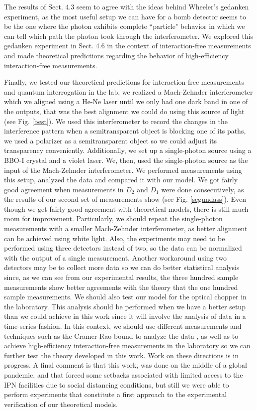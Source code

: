 \documentclass[12pt]{book}
\begin{document}
The results of Sect. 4.3 seem to agree with the ideas behind Wheeler's gedanken experiment, as the most useful setup we can have for a bomb detector seems to be the one where the photon exhibits complete ``particle" behavior in which we can tell which path the photon took through the interferometer. We explored this gedanken experiment in Sect. 4.6 in the context of interaction-free measurements and made theoretical predictions regarding the behavior of high-efficiency interaction-free measurements.

Finally, we tested our theoretical predictions for interaction-free measurements and quantum interrogation in the lab, we realized a Mach-Zehnder interferometer which we aligned using a He-Ne laser until we only had one dark band in one of the outputs, that was the best alignment we could do using this source of light (see Fig. \ref{best}). We used this interferometer to record the changes in the interference pattern when a semitransparent object is blocking one of its paths, we used a polarizer as a semitransparent object so we could adjust its transparency conveniently. Additionally, we set up a single-photon source using a BBO-I crystal and a violet laser. We, then, used the single-photon source as the input of the Mach-Zehnder interferometer. We performed measurements using this setup, analyzed the data and compared it with our model. We got fairly good agreement when measurements in $D_{2}$ and $D_{1}$ were done consecutively, as the results of our second set of measurements show (see Fig. \ref{segundass}). Even though we get fairly good agreement with theoretical models, there is still much room for improvement. Particularly, we should repeat the single-photon measurements with a smaller Mach-Zehnder interferometer, as better alignment can be achieved using white light. Also, the experiments may need to be performed using three detectors instead of two, so the data can be normalized with the output of a single measurement. Another workaround using two detectors may be to collect more data so we can do better statistical analysis since, as we can see from our experimental results, the three hundred sample measurements show better agreements with the theory that the one hundred sample measurements. We should also test our model for the optical chopper in the laboratory. This analysis should be performed when we have a better setup than we could achieve in this work since it will involve the analysis of data in a time-series fashion. In this context, we should use different measurements and techniques such as the Cramer-Rao bound to analyze the data \cite{Ferrie}, as well as to  achieve high-efficiency interaction-free measurements in the laboratory so we can further test the theory developed in this work. Work on these directions is in progress. A final comment is that this work, was done on the middle of a global pandemic, and that forced some setbacks associated with limited access to the IPN facilities due to social distancing conditions, but still we were able to perform experiments that constitute a first approach to the experimental verification of our theoretical models.





\pagebreak



\end{document}
